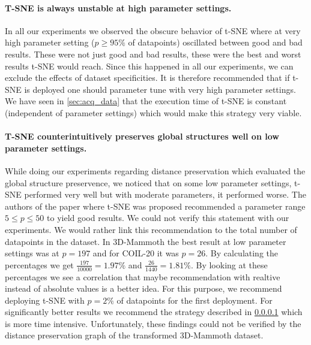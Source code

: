 \paragraph{T-SNE is always unstable at high parameter settings.} \label{par:tsne_unstable}
In all our experiments we observed the obscure behavior of t-SNE where at very high parameter setting ($p\geq 95\%$ of datapoints) oscillated between good and bad results. These were not just good and bad results, these were the best and worst results t-SNE would reach. Since this happened in all our experiments, we can exclude the effects of dataset specificities. It is therefore recommended that if t-SNE is deployed one should parameter tune with very high parameter settings. We have seen in \ref{sec:acq_data} that the execution time of t-SNE is constant (independent of parameter settings) which would make this strategy very viable.

\paragraph{T-SNE counterintuitively preserves global structures well on low parameter settings.}
While doing our experiments regarding distance preservation which evaluated the global structure preservence, we noticed that on some low parameter settings, t-SNE performed very well but with moderate parameters, it performed worse. The authors of the paper where t-SNE was proposed recommended a parameter range $5\leq p\leq 50$ to yield good results.\cite{t-SNE08} We could not verify this statement with our experiments. We would rather link this recommendation to the total number of datapoints in the dataset. In 3D-Mammoth the best result at low parameter settings was at $p=197$ and for COIL-20 it was $p=26$. By calculating the percentages we get $\frac{197}{10000}=1.97\%$ and $\frac{26}{1440}=1.81\%$. By looking at these percentages we see a correlation that maybe recommendation with realtive instead of absolute values is a better idea. For this purpose, we recommend deploying t-SNE with $p=2\%$ of datapoints for the first deployment. For significantly better results we recommend the strategy described in \ref{par:tsne_unstable} which is more time intensive. Unfortunately, these findings could not be verified by the distance preservation graph of the transformed 3D-Mammoth dataset.

